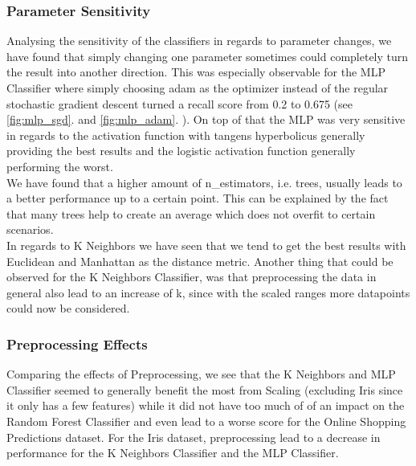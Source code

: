 \documentclass{article}
\newcommand{\secref}[1]{\autoref{#1}. \textit{\nameref{#1}}}
\begin{document}
\subsubsection{Parameter Sensitivity}
Analysing the sensitivity of the classifiers in regards to parameter changes, we have found that simply changing one parameter sometimes could completely turn the result into another direction. This was especially observable for the MLP Classifier where simply choosing adam as the optimizer instead of the regular stochastic gradient descent turned a recall score from 0.2 to 0.675 (see \secref{fig:mlp_sgd} and \secref{fig:mlp_adam}). On top of that the MLP was very sensitive in regards to the activation function with tangens hyperbolicus generally providing the best results and the logistic activation function generally performing the worst.\\
We have found that a higher amount of n\_estimators, i.e. trees, usually leads to a better performance up to a certain point. This can be explained by the fact that many trees help to create an average which does not overfit to certain scenarios.\\
In regards to K Neighbors we have seen that we tend to get the best results with Euclidean and Manhattan as the distance metric.  
Another thing that could be observed for the K Neighbors Classifier, was that preprocessing the data in general also lead to an increase of k, since with the scaled ranges  more datapoints could now be considered. \\
\newline
\subsubsection{Preprocessing Effects}
Comparing the effects of Preprocessing, we see that the K Neighbors and MLP Classifier seemed to generally benefit the most from Scaling (excluding Iris since it only has a few features) while it did not have too much of of an impact on the Random Forest Classifier and even lead to a worse score for the Online Shopping Predictions dataset. For the Iris dataset, preprocessing lead to a decrease in performance for the K Neighbors Classifier and the MLP Classifier.
\end{document}
